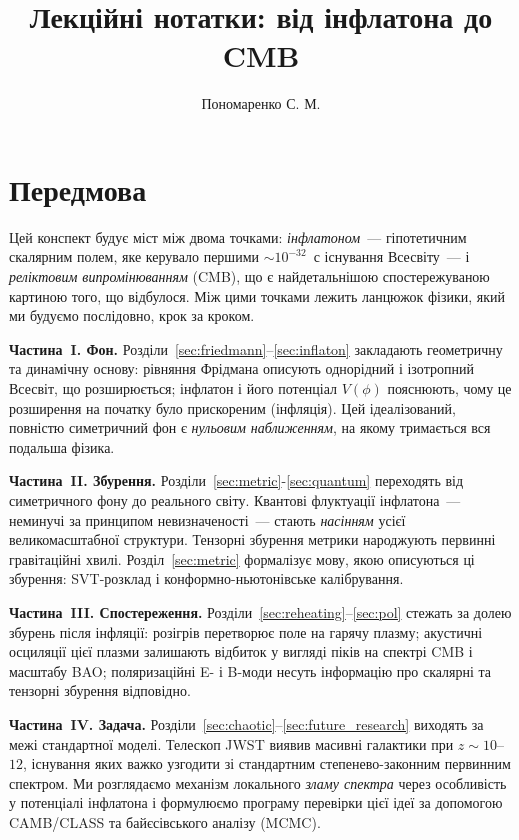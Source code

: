 \documentclass[12pt, a4paper]{article}
\title{\bfseries Лекційні нотатки: від інфлатона до CMB}
\author{Пономаренко С. М.}
\date{}
\begin{document}
\maketitle
\tableofcontents
\newpage



\section*{Передмова}


Цей конспект будує міст між двома точками: \emph{інфлатоном}~---
гіпотетичним скалярним полем, яке керувало першими
${\sim}10^{-32}$~с існування Всесвіту~--- і \emph{реліктовим випромінюванням} (CMB),
що є найдетальнішою спостережуваною картиною того, що відбулося.
Між цими точками лежить ланцюжок фізики, який ми будуємо
послідовно, крок за кроком.

\textbf{Частина~I. Фон.} Розділи~\ref{sec:friedmann}–\ref{sec:inflaton}
закладають геометричну та динамічну основу: рівняння Фрідмана описують
однорідний і ізотропний Всесвіт, що розширюється; інфлатон і його
потенціал $V(\phi)$ пояснюють, чому це розширення на початку було
прискореним (інфляція). Цей ідеалізований, повністю симетричний фон є
\emph{нульовим наближенням}, на якому тримається вся подальша фізика.

\textbf{Частина~II. Збурення.} Розділи~\ref{sec:metric}-\ref{sec:quantum}
переходять від симетричного фону до реального світу. Квантові флуктуації
інфлатона~--- неминучі за принципом невизначеності~--- стають
\emph{насінням} усієї великомасштабної структури. Тензорні збурення
метрики народжують первинні гравітаційні хвилі. Розділ~\ref{sec:metric}
формалізує мову, якою описуються ці збурення: SVT-розклад і
конформно-ньютонівське калібрування.

\textbf{Частина~III. Спостереження.} Розділи~\ref{sec:reheating}–\ref{sec:pol}
стежать за долею збурень після інфляції: розігрів перетворює поле на
гарячу плазму; акустичні осциляції цієї плазми залишають відбиток у
вигляді піків на спектрі CMB і масштабу BAO; поляризаційні E- і B-моди
несуть інформацію про скалярні та тензорні збурення відповідно.

\textbf{Частина~IV. Задача.} Розділи~\ref{sec:chaotic}–\ref{sec:future_research}
виходять за межі стандартної моделі. Телескоп JWST виявив масивні
галактики при $z \sim 10$–$12$, існування яких важко узгодити зі
стандартним степенево-законним первинним спектром. Ми розглядаємо
механізм локального \emph{зламу спектра} через особливість у потенціалі
інфлатона і формулюємо програму перевірки цієї ідеї за допомогою
CAMB/CLASS та байєсівського аналізу (MCMC).
\end{document}

